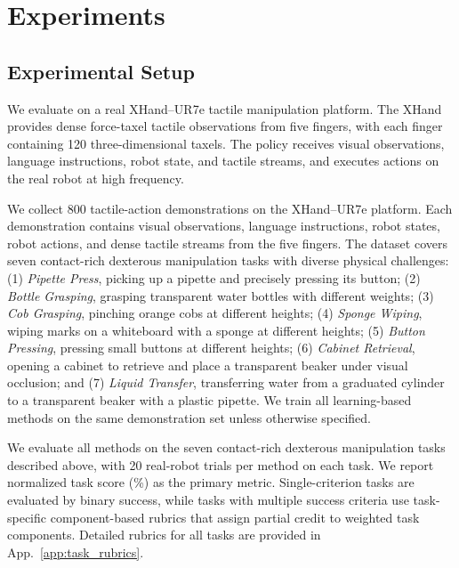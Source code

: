 \section{Experiments}
\subsection{Experimental Setup}
We evaluate \systemname on a real XHand--UR7e tactile manipulation platform. The XHand provides dense force-taxel tactile observations from five fingers, with each finger containing 120 three-dimensional taxels. The policy receives visual observations, language instructions, robot state, and tactile streams, and executes actions on the real robot at high frequency.

We collect 800 tactile-action demonstrations on the XHand--UR7e platform. Each demonstration contains visual observations, language instructions, robot states, robot actions, and dense tactile streams from the five fingers. The dataset covers seven contact-rich dexterous manipulation tasks with diverse physical challenges: (1) \textit{Pipette Press}, picking up a pipette and precisely pressing its button; (2) \textit{Bottle Grasping}, grasping transparent water bottles with different weights; (3) \textit{Cob Grasping}, pinching orange cobs at different heights; (4) \textit{Sponge Wiping}, wiping marks on a whiteboard with a sponge at different heights; (5) \textit{Button Pressing}, pressing small buttons at different heights; (6) \textit{Cabinet Retrieval}, opening a cabinet to retrieve and place a transparent beaker under visual occlusion; and (7) \textit{Liquid Transfer}, transferring water from a graduated cylinder to a transparent beaker with a plastic pipette. We train all learning-based methods on the same demonstration set unless otherwise specified.

We evaluate all methods on the seven contact-rich dexterous manipulation tasks described above, with 20 real-robot trials per method on each task. We report normalized task score (\%) as the primary metric. Single-criterion tasks are evaluated by binary success, while tasks with multiple success criteria use task-specific component-based rubrics that assign partial credit to weighted task components. Detailed rubrics for all tasks are provided in App.~\ref{app:task_rubrics}.

